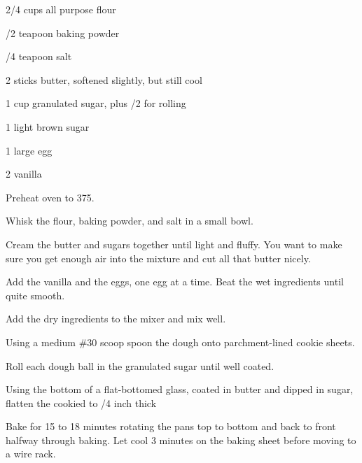
\begin{IngredientsAndSteps}
    \ListIngredientsAndSteps
    {
        2/4 cups all purpose flour

        /2 teapoon baking powder

        /4 teapoon salt

        \IngredientsSeparatorClear

        2 sticks butter, softened slightly, but still cool

        1 cup granulated sugar, plus /2 for rolling

        1 \Tbl light brown sugar

        \IngredientsSeparatorClear

        1 large egg

        2 \tsp[s] vanilla
    }
    {
        Preheat oven to 375\Degrees[F].

        Whisk the flour, baking powder, and salt in a small bowl.

        Cream the butter and sugars together until light and fluffy. You want to make sure you get
        enough air into the mixture and cut all that butter nicely.

        Add the vanilla and the eggs, one egg at a time. Beat the wet ingredients until quite smooth.

        Add the dry ingredients to the mixer and mix well.

        Using a medium \#30 scoop spoon the dough onto parchment-lined cookie sheets.

        Roll each dough ball in the granulated sugar until well coated.

        Using the bottom of a flat-bottomed glass, coated in butter and dipped in sugar,
        flatten the cookied to /4 inch thick

        Bake for 15 to 18 minutes rotating the pans top to bottom and back to front halfway
        through baking. Let cool 3 minutes on the baking sheet before moving to a wire rack.
    }
\end{IngredientsAndSteps}


